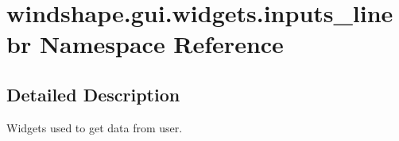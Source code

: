 \hypertarget{namespacewindshape_1_1gui_1_1widgets_1_1inputs__linebr}{}\section{windshape.\+gui.\+widgets.\+inputs\+\_\+linebr Namespace Reference}
\label{namespacewindshape_1_1gui_1_1widgets_1_1inputs__linebr}


\subsection{Detailed Description}
\begin{DoxyVerb}Widgets used to get data from user.
\end{DoxyVerb}
 